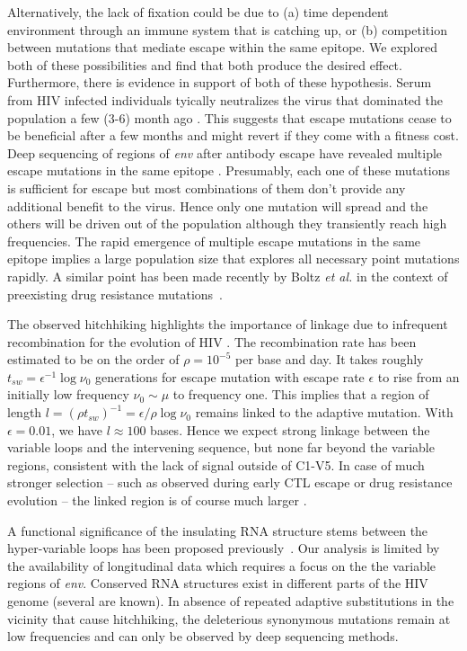 \documentclass[rmp, twocolumn]{revtex4}
\newcommand{\env}{\textit{env}}
\begin{document}
Alternatively, the lack of fixation could be due to (a) time dependent environment
through an immune system that is catching up, or (b) competition between mutations
that mediate escape within the same epitope. We explored both of these
possibilities and find that both produce the desired effect. Furthermore, there
is evidence in support of both of these hypothesis. Serum from HIV infected
individuals tyically neutralizes the virus that dominated the population a few
(3-6) month ago \citep{richman_rapid_2003}. This suggests that escape mutations
cease to be beneficial after a few months and might revert if they come with a
fitness cost. Deep sequencing of regions of \env{} after antibody escape have
revealed multiple escape mutations in the same epitope
\citep{moore_limited_2009, bar_early_2012}. Presumably, each one of these
mutations is sufficient for escape but most combinations of them don't provide
any additional benefit to the virus. Hence only one mutation will spread and the
others will be driven out of the population although they transiently reach high
frequencies. The rapid emergence of multiple escape mutations in the same
epitope implies a large population size that explores all necessary point mutations rapidly. A
similar point has been made recently by Boltz {\it et al.} in the context of
preexisting drug resistance mutations~\citep{boltz_ultrasensitive_2012}. 

The observed hitchhiking highlights the importance of linkage due to infrequent
recombination for the evolution of HIV
\citep{neher_recombination_2010,batorsky_estimate_2011,
josefsson_majority_2011}. The recombination rate has been estimated to be on the
order of $\rho = 10^{-5}$ per base and day. It takes roughly $t_{sw} =
\epsilon^{-1} \log \nu_0$ generations for escape mutation with escape rate
$\epsilon$ to rise from an initially low frequency $\nu_0\sim \mu$ to frequency
one. This implies that a region of length $l = (\rho t_{sw})^{-1} = \epsilon /
\rho \log \nu_0$ remains linked to the adaptive mutation. With $\epsilon=0.01$,
we have $l\approx 100$ bases. Hence we expect strong linkage between the
variable loops and the intervening sequence, but none far beyond the variable
regions, consistent with the lack of signal outside of C1-V5. In case of much
stronger selection -- such as observed during early CTL escape or drug
resistance evolution -- the linked  region is of course much larger
\citep{nijhuis_stochastic_1998}.

A functional significance of the insulating RNA structure stems between the
hyper-variable loops has been proposed
previously~\citep{watts_architecture_2009, sanjuan_interplay_2011}.
Our analysis is limited by the availability of
longitudinal data which requires a focus on the the variable regions of \env.
Conserved RNA structures exist in different parts of the HIV genome (several are
known). In absence of repeated adaptive substitutions in the vicinity that cause
hitchhiking, the deleterious synonymous mutations remain at low frequencies and
can only be observed by deep sequencing methods. 
\end{document}
